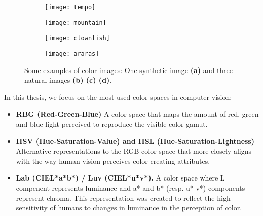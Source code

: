 \begin{figure}[!ht]
    \centering
    \begin{subfigure}[b]{0.24\textwidth}
        \texttt{[image: tempo]}
        \caption{}
        \label{fig:tempo}
    \end{subfigure}
    \begin{subfigure}[b]{0.24\textwidth}
        \texttt{[image: mountain]}
        \caption{}
        \label{fig:parrots}
    \end{subfigure} 
    \begin{subfigure}[b]{0.24\textwidth}
        \texttt{[image: clownfish]}
        \caption{}
        \label{fig:clownfish}
    \end{subfigure}
    \begin{subfigure}[b]{0.24\textwidth}
        \texttt{[image: araras]}
        \caption{}
        \label{fig:mountains}
    \end{subfigure}
                  
    \caption{Some examples of color images: One synthetic image {\small \textsf{\textbf{(a)}}} and three natural images {\small \textsf{\textbf{(b) (c) (d)}}}.}\label{fig:color_images}    
\end{figure}

In this thesis, we focus on the most used color spaces in computer vision:
\begin{itemize}

	\item \textbf{RBG (Red-Green-Blue)} A color space that maps the amount of red, green and blue light perceived to reproduce the visible color gamut.
	\item \textbf{HSV (Hue-Saturation-Value) and HSL (Hue-Saturation-Lightness)} Alternative representations to the RGB color space that more closely aligns with the way human vision perceives color-creating attributes.
	\item \textbf{Lab (CIEL*a*b*) / Luv (CIEL*u*v*).} A color space where L compenent represents luminance and a* and b* (resp. u* v*) components represent chroma. This representation was created to reflect the high sensitivity of humans to changes in luminance in the perception of color.
\end{itemize}


